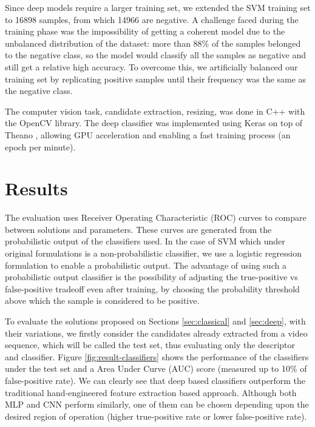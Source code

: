        Since deep models require a larger training set, we extended the SVM training set to 16898 samples, from which 14966 are negative. A challenge faced during the training phase was the impossibility of getting a coherent model due to the unbalanced distribution of the dataset: more than 88\% of the samples belonged to the negative class, so the model would classify all the samples as negative and still get a relative high accuracy. To overcome this, we artificially balanced our training set by replicating positive samples until their frequency was the same as the negative class.

        The computer vision task, candidate extraction, resizing, was done in C++ with the OpenCV library. The deep classifier was implemented using Keras \cite{keras} on top of Theano \cite{theano}, allowing GPU acceleration and enabling a fast training process (an epoch per minute).


\section{Results}
\label{sec:results}

    The evaluation uses Receiver Operating Characteristic (ROC) curves \cite{evaluationMetrics} to compare between solutions and parameters. These curves are generated from the probabilistic output of the classifiers used. In the case of SVM which under original formulations is a non-probabilistic classifier, we use a logistic regression formulation \cite{svmProbabilisticOutput} to enable a probabilistic output. The advantage of using such a probabilistic output classifier is the possibility of adjusting the true-positive vs false-positive tradeoff even after training, by choosing the probability threshold above which the sample is considered to be positive.

    To evaluate the solutions proposed on Sections \ref{sec:classical} and \ref{sec:deep}, with their variations, we firstly consider the candidates already extracted from a video sequence, which will be called the test set, thus evaluating only the descriptor and classifier. Figure \ref{fig:result-classifiers} shows the performance of the classifiers under the test set and a Area Under Curve (AUC) score \cite{evaluationMetrics} (measured up to 10\% of false-positive rate). We can clearly see that deep based classifiers outperform the traditional hand-engineered feature extraction based approach. Although both MLP and CNN perform similarly, one of them can be chosen depending upon the desired region of operation (higher true-positive rate or lower false-positive rate).

